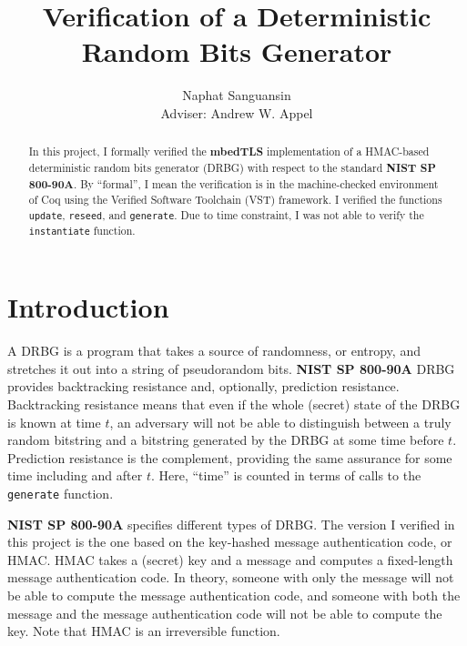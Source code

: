 \documentclass[pageno]{jpaper}
\newcommand{\stdtitle}[1]{\textbf{#1}}
\begin{document}
\title{
Verification of a Deterministic Random Bits Generator
}

\author{Naphat Sanguansin\\Adviser: Andrew W. Appel}

\date{}
\maketitle

\thispagestyle{empty}
\doublespacing
\begin{abstract}
In this project, I formally verified the \stdtitle{mbedTLS} implementation of a HMAC-based deterministic random bits generator (DRBG) with respect to the standard \stdtitle{NIST SP 800-90A}. By “formal”, I mean the verification is in the machine-checked environment of Coq using the Verified Software Toolchain (VST) framework. I verified the functions \lstinline{update}, \lstinline{reseed}, and \lstinline{generate}. Due to time constraint, I was not able to verify the \lstinline{instantiate} function.
\end{abstract}

\section{Introduction}
A DRBG is a program that takes a source of randomness, or entropy, and stretches it out into a string of pseudorandom bits. \stdtitle{NIST SP 800-90A} \cite{nist} DRBG provides backtracking resistance and, optionally, prediction resistance. Backtracking resistance means that even if the whole (secret) state of the DRBG is known at time $t$, an adversary will not be able to distinguish between a truly random bitstring and a bitstring generated by the DRBG at some time before $t$. Prediction resistance is the complement, providing the same assurance for some time including and after $t$. Here, “time” is counted in terms of calls to the \lstinline{generate} function.

\stdtitle{NIST SP 800-90A} specifies different types of DRBG. The version I verified in this project is the one based on the key-hashed message authentication code, or HMAC. HMAC takes a (secret) key and a message and computes a fixed-length message authentication code. In theory, someone with only the message will not be able to compute the message authentication code, and someone with both the message and the message authentication code will not be able to compute the key. Note that HMAC is an irreversible function.
\end{document}

